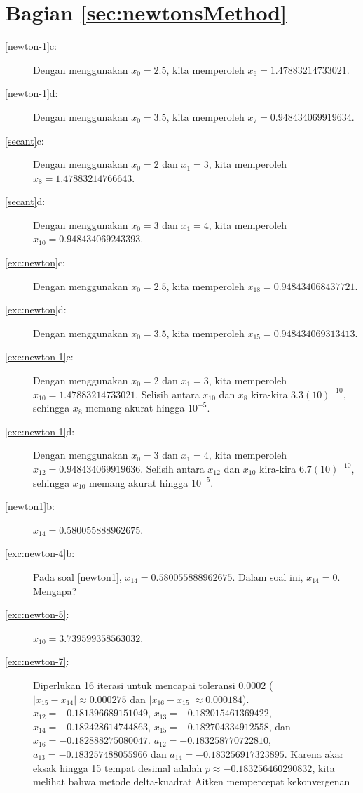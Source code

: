 \section*{Bagian \ref{sec:newtonsMethod}}
\begin{description}
\item [{\ref{newton-1}c:}] Dengan menggunakan $x_{0}=2.5$, kita memperoleh
$x_{6}=1.47883214733021$.
\item [{\ref{newton-1}d:}] Dengan menggunakan $x_{0}=3.5$, kita memperoleh
$x_{7}=0.948434069919634$.
\item [{\ref{secant}c:}] Dengan menggunakan $x_{0}=2$ dan $x_{1}=3$,
kita memperoleh $x_{8}=1.47883214766643$.
\item [{\ref{secant}d:}] Dengan menggunakan $x_{0}=3$ dan $x_{1}=4$,
kita memperoleh $x_{10}=0.948434069243393$.
\item [{\ref{exc:newton}c:}] Dengan menggunakan $x_{0}=2.5$, kita memperoleh
$x_{18}=0.948434068437721$.
\item [{\ref{exc:newton}d:}] Dengan menggunakan $x_{0}=3.5$, kita memperoleh
$x_{15}=0.948434069313413$.
\item [{\ref{exc:newton-1}c:}] Dengan menggunakan $x_{0}=2$ dan $x_{1}=3$,
kita memperoleh $x_{10}=1.47883214733021$. Selisih antara $x_{10}$
dan $x_{8}$ kira-kira $3.3(10)^{-10}$, sehingga $x_{8}$ memang
akurat hingga $10^{-5}$.
\item [{\ref{exc:newton-1}d:}] Dengan menggunakan $x_{0}=3$ dan $x_{1}=4$,
kita memperoleh $x_{12}=0.948434069919636$. Selisih antara $x_{12}$
dan $x_{10}$ kira-kira $6.7(10)^{-10}$, sehingga $x_{10}$ memang
akurat hingga $10^{-5}$.
\item [{\ref{newton1}b:}] $x_{14}=0.580055888962675$.
\item [{\ref{exc:newton-4}b:}] Pada soal \ref{newton1}, $x_{14}=0.580055888962675$.
Dalam soal ini, $x_{14}=0$. Mengapa?
\item [{\ref{exc:newton-5}:}] $x_{10}=3.739599358563032$.
\item [{\ref{exc:newton-7}:}] Diperlukan 16 iterasi untuk mencapai toleransi
$0.0002$ ($|x_{15}-x_{14}|\approx0.000275$ dan $|x_{16}-x_{15}|\approx0.000184$).
$x_{12}=-0.181396689151049$, $x_{13}=-0.182015461369422$, $x_{14}=-0.182428614744863$,
$x_{15}=-0.182704334912558$, dan $x_{16}=-0.182888275080047$. $a_{12}=-0.183258770722810$,
$a_{13}=-0.183257488055966$ dan $a_{14}=-0.183256917323895$. Karena
akar eksak hingga 15 tempat desimal adalah $p\approx-0.183256460290832$,
kita melihat bahwa metode delta-kuadrat Aitken mempercepat kekonvergenan

\end{description}
